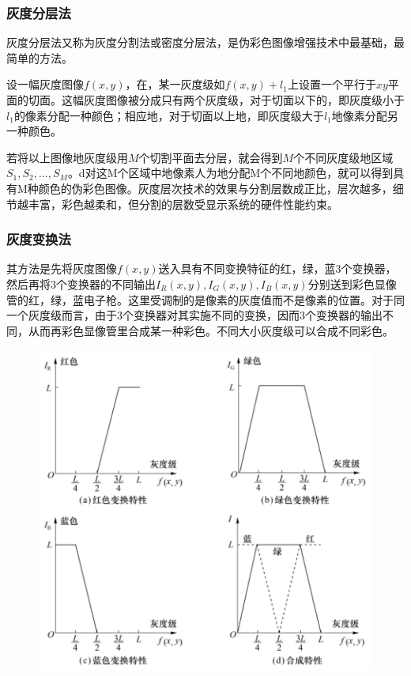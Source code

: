 \documentclass[11pt]{article}
\begin{document}
\subsubsection{灰度分层法}
灰度分层法又称为灰度分割法或密度分层法，是伪彩色图像增强技术中最基础，最简单的方法。

设一幅灰度图像$f(x,y)$，在，某一灰度级如$f(x,y)+l_1$上设置一个平行于$xy$平面的切面。这幅灰度图像被分成只有两个灰度级，对于切面以下的，即灰度级小于$l_1$的像素分配一种颜色；相应地，对于切面以上地，即灰度级大于$l_1$地像素分配另一种颜色。

若将以上图像地灰度级用$M$个切割平面去分层，就会得到$M$个不同灰度级地区域$S_1,S_2,...,S_M$。d对这M个区域中地像素人为地分配M个不同地颜色，就可以得到具有M种颜色的伪彩色图像。灰度层次技术的效果与分割层数成正比，层次越多，细节越丰富，彩色越柔和，但分割的层数受显示系统的硬件性能约束。

\subsubsection{灰度变换法}
其方法是先将灰度图像$f(x,y)$送入具有不同变换特征的红，绿，蓝3个变换器，然后再将3个变换器的不同输出$I_R(x,y),I_G(x,y),I_B(x,y)$分别送到彩色显像管的红，绿，蓝电子枪。这里受调制的是像素的灰度值而不是像素的位置。对于同一个灰度级而言，由于3个变换器对其实施不同的变换，因而3个变换器的输出不同，从而再彩色显像管里合成某一种彩色。不同大小灰度级可以合成不同彩色。

\begin{figure}[H]
	\centering
	\includegraphics[scale=0.5]{29}
\end{figure}
\end{document}
